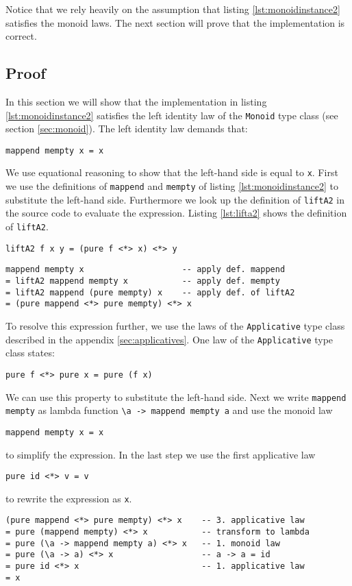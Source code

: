 Notice that we rely heavily on the assumption that listing \ref{lst:monoidinstance2} satisfies the monoid laws. The next section will prove that the implementation is correct.

\subsection{Proof}
\label{sec:exampleproof}

In this section we will show that the implementation in listing \ref{lst:monoidinstance2} satisfies the left identity law of the \verb|Monoid| type class (see section \ref{sec:monoid}).
The left identity law demands that:
\begin{verbatim}
mappend mempty x = x
\end{verbatim}

We use equational reasoning to show that the left-hand side is equal to \verb|x|. First we use the definitions of \verb|mappend| and \verb|mempty| of listing \ref{lst:monoidinstance2} to substitute the left-hand side. Furthermore we look up the definition of \verb|liftA2| in the source code \cite{control.applicative} to evaluate the expression. 
Listing \ref{lst:lifta2} shows the definition of \verb|liftA2|.

\begin{lstlisting}[caption={Function definition of {\ttfamily liftA2}},label={lst:lifta2}]
liftA2 f x y = (pure f <*> x) <*> y
\end{lstlisting}

\begin{verbatim}
mappend mempty x                    -- apply def. mappend
= liftA2 mappend mempty x           -- apply def. mempty
= liftA2 mappend (pure mempty) x    -- apply def. of liftA2
= (pure mappend <*> pure mempty) <*> x
\end{verbatim}

To resolve this expression further, we use the laws of the \verb|Applicative| type class described in the appendix \ref{sec:applicatives}.
One law of the \verb|Applicative| type class states:
\begin{verbatim}
pure f <*> pure x = pure (f x)
\end{verbatim}
We can use this property to substitute the left-hand side. Next we write \verb|mappend mempty| as lambda function \verb|\a -> mappend mempty a| and use the monoid law
\begin{verbatim}
mappend mempty x = x
\end{verbatim}
to simplify the expression. In the last step we use the first applicative law
\begin{verbatim}
pure id <*> v = v
\end{verbatim}
 to rewrite the expression as \verb|x|.
\begin{verbatim}
(pure mappend <*> pure mempty) <*> x    -- 3. applicative law
= pure (mappend mempty) <*> x           -- transform to lambda
= pure (\a -> mappend mempty a) <*> x   -- 1. monoid law 
= pure (\a -> a) <*> x                  -- a -> a = id
= pure id <*> x                         -- 1. applicative law
= x
\end{verbatim}

